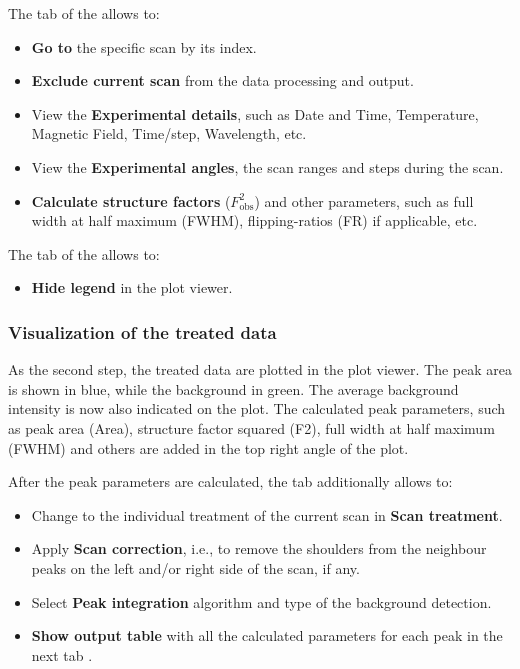 The  tab of the  allows to:

\begin{itemize}
	\item \textbf{Go to} the specific scan by its index.
	\item \textbf{Exclude current scan} from the data processing and output.
	\item View the \textbf{Experimental details}, such as Date and Time, Temperature, Magnetic Field, Time/step, Wavelength, etc.
	\item View the \textbf{Experimental angles}, the scan ranges and steps during the scan.
	\item \textbf{Calculate structure factors} ($F^2_\text{obs}$) and other parameters, such as full width at half maximum (FWHM), flipping-ratios (FR) if applicable, etc.
\end{itemize}

The  tab of the  allows to:

\begin{itemize}
	\item \textbf{Hide legend} in the plot viewer.
\end{itemize}

\subsubsection{Visualization of the treated data}

As the second step, the treated data are plotted in the plot viewer. The peak area is shown in blue, while the background in green. The average background intensity is now also indicated on the plot. The calculated peak parameters, such as peak area (Area), structure factor squared (F2), full width at half maximum (FWHM) and others are added in the top right angle of the plot.


After the peak parameters are calculated, the  tab additionally allows to:

\begin{itemize}
	\item Change to the individual treatment of the current scan in \textbf{Scan treatment}.
	\item Apply \textbf{Scan correction}, i.e., to remove the shoulders from the neighbour peaks on the left and/or right side of the scan, if any.
	\item Select \textbf{Peak integration} algorithm and type of the background detection.
	\item \textbf{Show output table} with all the calculated parameters for each peak in the next tab .
\end{itemize}

